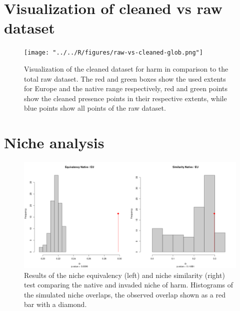 \newpage
\appendix

\section{Visualization of cleaned vs raw dataset}

\begin{figure}[!h]
    \centering
    \texttt{[image: "../../R/figures/raw-vs-cleaned-glob.png"]}
    \caption{\label{fig:raw_vs_cleaned_glob} Visualization of the cleaned dataset for \gls{harm} in comparison to the total raw dataset. The red and green boxes show the used extents for Europe and the native range respectively, red and green points show the cleaned presence points in their respective extents, while blue points show all points of the raw dataset.}
\end{figure}



\section{Niche analysis}

\begin{figure}[!h]
    \centering
    \includegraphics[width = 0.9\linewidth]{"../../R/figures/as-eu-tot-eq-sim.png"}
    \caption{\label{fig:as_eu_eq_sim} Results of the niche equivalency (left) and niche similarity (right) test comparing the native and invaded niche of \gls{harm}. Histograms of the simulated niche overlaps, the observed overlap shown as a red bar with a diamond.}
\end{figure}

